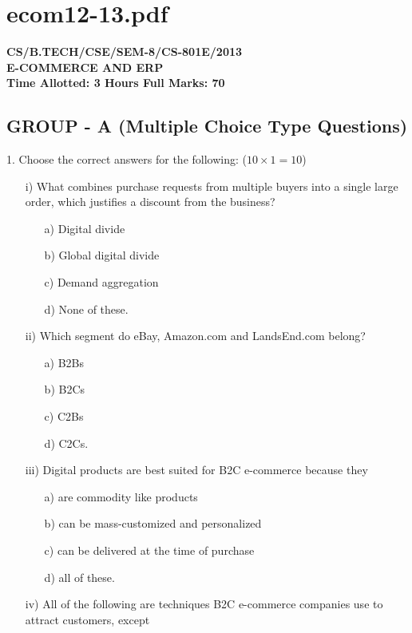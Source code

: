 \documentclass{article}
\begin{document}
\newpage
\section*{ecom12-13.pdf}
\textbf{CS/B.TECH/CSE/SEM-8/CS-801E/2013} \\
\textbf{E-COMMERCE AND ERP} \\
\textbf{Time Allotted: 3 Hours \hfill Full Marks: 70}

\subsection*{GROUP - A (Multiple Choice Type Questions)}
1. Choose the correct answers for the following: ($10 \times 1 = 10$)
\begin{enumerate}
    \item[i)] What combines purchase requests from multiple buyers into a single large order, which justifies a discount from the business?
    \begin{enumerate}
        \item[a)] Digital divide
        \item[b)] Global digital divide
        \item[c)] Demand aggregation
        \item[d)] None of these.
    \end{enumerate}
    \item[ii)] Which segment do eBay, Amazon.com and LandsEnd.com belong?
    \begin{enumerate}
        \item[a)] B2Bs
        \item[b)] B2Cs
        \item[c)] C2Bs
        \item[d)] C2Cs.
    \end{enumerate}
    \item[iii)] Digital products are best suited for B2C e-commerce because they
    \begin{enumerate}
        \item[a)] are commodity like products
        \item[b)] can be mass-customized and personalized
        \item[c)] can be delivered at the time of purchase
        \item[d)] all of these.
    \end{enumerate}
    \item[iv)] All of the following are techniques B2C e-commerce companies use to attract customers, except

\end{enumerate}
\end{document}
